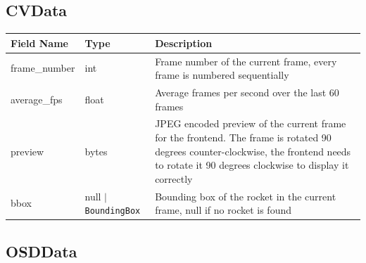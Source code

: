 \documentclass[12pt, titlepage]{article}
\begin{document}
\subsection{CVData}

\begin{center}
  \begin{tabular}{p{4cm} p{3cm} p{8cm}}
    \toprule
    \textbf{Field Name} & \textbf{Type}                 & \textbf{Description}                                                                                                                                                                        \\
    \midrule
    frame\_number       & int                           & Frame number of the current frame, every frame is numbered sequentially                                                                                                                     \\
    average\_fps        & float                         & Average frames per second over the last 60 frames                                                                                                                                           \\
    preview             & bytes                         & JPEG encoded preview of the current frame for the frontend. The frame is rotated 90 degrees counter-clockwise, the frontend needs to rotate it 90 degrees clockwise to display it correctly \\
    bbox                & null $|$ \texttt{BoundingBox} & Bounding box of the rocket in the current frame, null if no rocket is found                                                                                                                 \\
    \bottomrule
  \end{tabular}
\end{center}

\subsection{OSDData}
\end{document}
